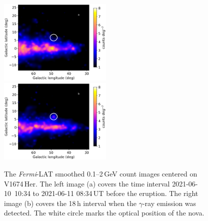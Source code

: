 \documentclass[a4paper,fleqn,usenatbib]{mnras}
\newcommand{\nova}{V1674\,Her}
\newcommand{\fermilat}{\emph{Fermi}-LAT}
\begin{document}
\begin{figure}
\includegraphics[width=0.48\textwidth,clip=true,trim=0cm 0cm 0cm 0cm,angle=0]{Image_V1674_Her_before_a.eps}~~
\includegraphics[width=0.48\textwidth,clip=true,trim=0cm 0cm 0cm 0cm,angle=0]{Image_V1674_Her_after_b.eps}
\caption{The \fermilat{} smoothed 0.1--2\,GeV count images centered on \nova{}. The left image (a) covers the time interval
2021-06-10~10:34 to 2021-06-11 08:34\,UT before the eruption. 
The right image (b) covers the 18\,h interval when the $\gamma$-ray emission was detected.
The white circle marks the optical position of the nova.}
    \label{fig:latimg}
\end{figure}
\end{document}
